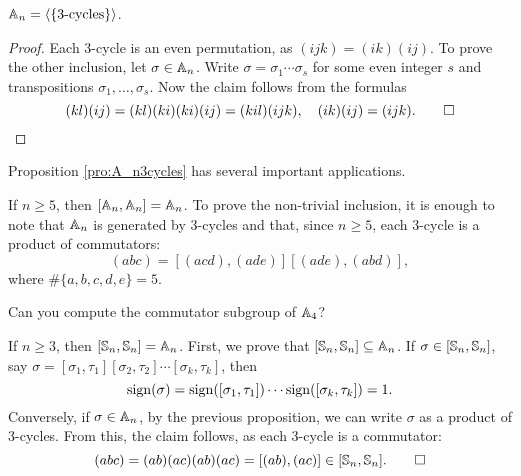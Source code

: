 \begin{proposition}
\label{pro:A_n3cycles}
$\mathbb{A}_n=\langle\{\text{3-cycles}\}\rangle$.
\end{proposition}

\begin{proof}
Each 3-cycle is an even permutation, as $(ijk)=(ik)(ij)$. 
To prove the other inclusion, let $\sigma\in\mathbb{A}_n$.
Write $\sigma=\sigma_1\cdots\sigma_s$ for some even integer $s$ 
and transpositions $\sigma_1,\dots,\sigma_s$. 
Now the claim follows from the formulas 
\[
(kl)(ij)=(kl)(ki)(ki)(ij)=(kil)(ijk),\quad
(ik)(ij)=(ijk).\qedhere
\]
 \end{proof}

Proposition \ref{pro:A_n3cycles} has several 
important applications. 

\begin{example}
If $n\geq5$, then $[\mathbb{A}_n,\mathbb{A}_n]=\mathbb{A}_n$. To prove the non-trivial
inclusion, it is enough to note that $\mathbb{A}_n$ is generated by 
3-cycles and that, since $n\geq5$, each 3-cycle 
is a product of commutators: 
\[
(abc)=[(acd),(ade)][(ade),(abd)],
\]
where $\#\{a,b,c,d,e\}=5$.
\end{example}

Can you compute the commutator subgroup of $\mathbb{A}_4$? 

\begin{example}
If $n\geq3$, then $[\mathbb{S}_n,\mathbb{S}_n]=\mathbb{A}_n$. First, we prove that $[\mathbb{S}_n,\mathbb{S}_n]\subseteq\mathbb{A}_n$. If 
$\sigma\in[\mathbb{S}_n,\mathbb{S}_n]$,
say $\sigma=[\sigma_1,\tau_1][\sigma_2,\tau_2]\cdots[\sigma_k,\tau_k]$, then
\[
\operatorname{sign}(\sigma)=\operatorname{sign}([\sigma_1,\tau_1])\cdots\operatorname{sign}([\sigma_k,\tau_k])=1.
\]
Conversely, if $\sigma\in\mathbb{A}_n$, by the previous proposition, 
we can write $\sigma$ as a product of 3-cycles. 
From this, the claim follows, as each 3-cycle is a commutator: 
\[
(abc)=(ab)(ac)(ab)(ac)=[(ab),(ac)]\in[\mathbb{S}_n,\mathbb{S}_n].\qedhere
\]
\end{example}
